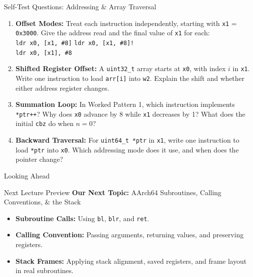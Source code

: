 \documentclass[aspectratio=169,11pt,t]{beamer}
\newcommand{\key}[1]{\textbf{#1}}
\newcommand{\bits}[1]{\texttt{#1}}
\newcommand{\hex}[1]{\texttt{0x#1}}
\newcommand{\code}[1]{\texttt{#1}}
\begin{document}
\begin{frame}{Self-Test Questions: Addressing \& Array Traversal}

\begin{enumerate}\setlength{\itemsep}{7pt}
  \item \key{Offset Modes:} Treat each instruction independently, starting with \bits{x1} = \hex{3000}. Give the address read and the final value of \bits{x1} for each:\\[0.08cm]
  \code{ldr x0, [x1, \#8]} \quad \code{ldr x0, [x1, \#8]!}\\
  \code{ldr x0, [x1], \#8}

  \item \key{Shifted Register Offset:} A \code{uint32\_t} array starts at \bits{x0}, with index $i$ in \bits{x1}. Write one instruction to load \code{arr[i]} into \bits{w2}. Explain the shift and whether either address register changes.

  \item \key{Summation Loop:} In Worked Pattern 1, which instruction implements \code{*ptr++}? Why does \bits{x0} advance by 8 while \bits{x1} decreases by 1? What does the initial \code{cbz} do when $n = 0$?

  \item \key{Backward Traversal:} For \code{uint64\_t *ptr} in \bits{x1}, write one instruction to load \code{*\char45{}ptr} into \bits{x0}. Which addressing mode does it use, and when does the pointer change?
\end{enumerate}

\end{frame}


\begin{frame}{Looking Ahead}

\begin{block}{Next Lecture Preview}
\key{Our Next Topic:}
AArch64 Subroutines, Calling Conventions, \& the Stack
\end{block}

\vfill

\begin{itemize}\setlength{\itemsep}{7pt}
  \item \key{Subroutine Calls:} Using \code{bl}, \code{blr}, and \code{ret}.
  \item \key{Calling Convention:} Passing arguments, returning values, and preserving registers.
  \item \key{Stack Frames:} Applying stack alignment, saved registers, and frame layout in real subroutines.
\end{itemize}

\vfill
\end{frame}
\end{document}
